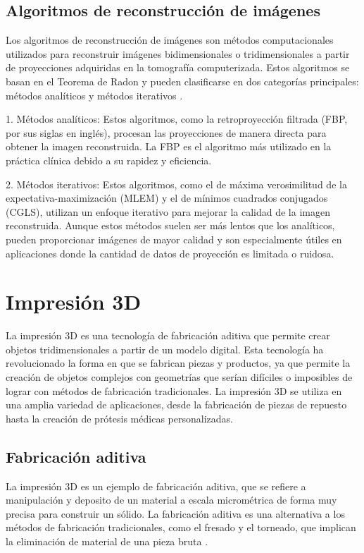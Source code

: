 \subsection{Algoritmos de reconstrucción de imágenes}
Los algoritmos de reconstrucción de imágenes son métodos computacionales utilizados para reconstruir imágenes bidimensionales o tridimensionales a partir de proyecciones adquiridas en la tomografía computerizada. Estos algoritmos se basan en el Teorema de Radon y pueden clasificarse en dos categorías principales: métodos analíticos \cite{kontaxakis2002reconstruccion} y métodos iterativos \cite{Willemink2013}.

1. Métodos analíticos: Estos algoritmos, como la retroproyección filtrada (FBP, por sus siglas en inglés), procesan las proyecciones de manera directa para obtener la imagen reconstruida. La FBP es el algoritmo más utilizado en la práctica clínica debido a su rapidez y eficiencia.

2. Métodos iterativos: Estos algoritmos, como el de máxima verosimilitud de la expectativa-maximización (MLEM) y el de mínimos cuadrados conjugados (CGLS), utilizan un enfoque iterativo para mejorar la calidad de la imagen reconstruida. Aunque estos métodos suelen ser más lentos que los analíticos, pueden proporcionar imágenes de mayor calidad y son especialmente útiles en aplicaciones donde la cantidad de datos de proyección es limitada o ruidosa.



\section{Impresión 3D}

La impresión 3D es una tecnología de fabricación aditiva que permite crear objetos tridimensionales a partir de un modelo digital. Esta tecnología ha revolucionado la forma en que se fabrican piezas y productos, ya que permite la creación de objetos complejos con geometrías que serían difíciles o imposibles de lograr con métodos de fabricación tradicionales. La impresión 3D se utiliza en una amplia variedad de aplicaciones, desde la fabricación de piezas de repuesto hasta la creación de prótesis médicas personalizadas.

\subsection{Fabricación aditiva}

La impresión 3D es un ejemplo de fabricación aditiva, que se refiere a manipulación y deposito de un material a escala micrométrica de forma muy precisa para construir un sólido. La fabricación aditiva es una alternativa a los métodos de fabricación tradicionales, como el fresado y el torneado, que implican la eliminación de material de una pieza bruta \cite{zahera2012fabricacion}.


